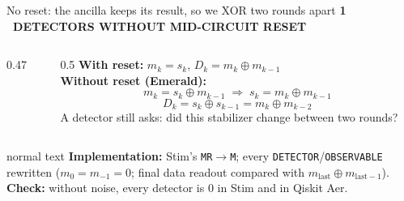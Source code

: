 \documentclass[aspectratio=169,11pt]{beamer}
\newcommand{\eyebrow}[1]{{\color{accent}\scriptsize\bfseries\MakeUppercase{#1}}\par\smallskip}
\begin{document}
\begin{frame}{No reset: the ancilla keeps its result, so we XOR two rounds apart}
\eyebrow{1 \textperiodcentered\ Detectors without mid-circuit reset}
\begin{columns}[T]
\begin{column}{0.47\textwidth}
\centering
{}
\end{column}
\begin{column}{0.5\textwidth}
\small
\textbf{With reset:} \quad $m_k = s_k$, \quad $D_k = m_k \oplus m_{k-1}$\\[6pt]
\textbf{Without reset (Emerald):}
\[ m_k = s_k \oplus m_{k-1} \;\Rightarrow\; s_k = m_k \oplus m_{k-1} \]
\[ D_k = s_k \oplus s_{k-1} = \boxed{m_k \oplus m_{k-2}} \]
{\color{soft}\footnotesize A detector still asks: did this stabilizer change between two rounds?}
\end{column}
\end{columns}
\vfill
\begin{beamercolorbox}[rounded=true,sep=6pt]{normal text}
\footnotesize \textbf{Implementation:} Stim's \texttt{MR}$\rightarrow$\texttt{M}; every \texttt{DETECTOR}/\texttt{OBSERVABLE} rewritten ($m_0=m_{-1}=0$; final data readout compared with $m_{\text{last}}\oplus m_{\text{last}-1}$).
\textbf{Check:} without noise, every detector is 0 in Stim and in Qiskit Aer.
\end{beamercolorbox}
\end{frame}
\end{document}
